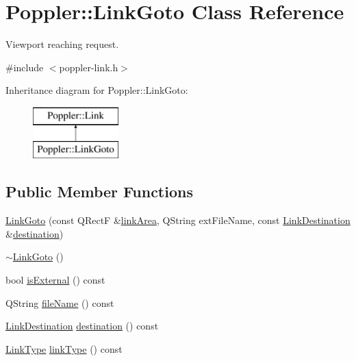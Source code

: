 \hypertarget{class_poppler_1_1_link_goto}{}\section{Poppler\+:\+:Link\+Goto Class Reference}
\label{class_poppler_1_1_link_goto}


Viewport reaching request.  




{\ttfamily \#include $<$poppler-\/link.\+h$>$}

Inheritance diagram for Poppler\+:\+:Link\+Goto\+:\begin{figure}[H]
\begin{center}
\leavevmode
\includegraphics[height=2.000000cm]{class_poppler_1_1_link_goto}
\end{center}
\end{figure}
\subsection*{Public Member Functions}
\begin{DoxyCompactItemize}
\item 
\hyperlink{class_poppler_1_1_link_goto_a840e25247ce9e2d38e74116222f54bbf}{Link\+Goto} (const Q\+RectF \&\hyperlink{class_poppler_1_1_link_adb525b65cfac39dcdba3f59faa57a0bf}{link\+Area}, Q\+String ext\+File\+Name, const \hyperlink{class_poppler_1_1_link_destination}{Link\+Destination} \&\hyperlink{class_poppler_1_1_link_goto_aa09835c861c3c0ef32555c25f6325a22}{destination})
\item 
\hyperlink{class_poppler_1_1_link_goto_af2947099da72e0b102a62313f7c6d211}{$\sim$\+Link\+Goto} ()
\item 
bool \hyperlink{class_poppler_1_1_link_goto_a892497a8afa41fdafca1573f6dc6e9c7}{is\+External} () const
\item 
Q\+String \hyperlink{class_poppler_1_1_link_goto_a2ca06b1b69c22b92490750b6cf7487f8}{file\+Name} () const
\item 
\hyperlink{class_poppler_1_1_link_destination}{Link\+Destination} \hyperlink{class_poppler_1_1_link_goto_aa09835c861c3c0ef32555c25f6325a22}{destination} () const
\item 
\hyperlink{class_poppler_1_1_link_af0dacfa77a548bb043dbae4bb9dc6c1e}{Link\+Type} \hyperlink{class_poppler_1_1_link_goto_a4060fbbbe4ebcb4bd55e737659b55092}{link\+Type} () const
\end{DoxyCompactItemize}

